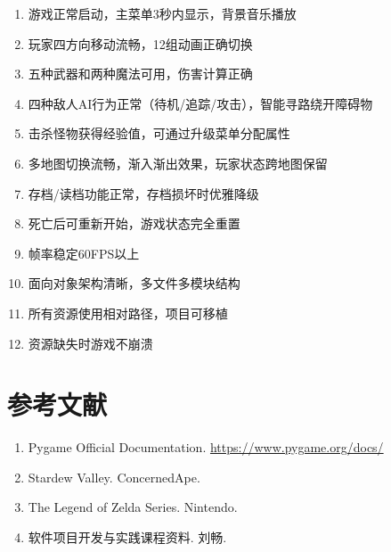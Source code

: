 \documentclass[12pt,a4paper]{article}
\begin{document}
\begin{enumerate}[leftmargin=2em]
    \item 游戏正常启动，主菜单3秒内显示，背景音乐播放
    \item 玩家四方向移动流畅，12组动画正确切换
    \item 五种武器和两种魔法可用，伤害计算正确
    \item 四种敌人AI行为正常（待机/追踪/攻击），智能寻路绕开障碍物
    \item 击杀怪物获得经验值，可通过升级菜单分配属性
    \item 多地图切换流畅，渐入渐出效果，玩家状态跨地图保留
    \item 存档/读档功能正常，存档损坏时优雅降级
    \item 死亡后可重新开始，游戏状态完全重置
    \item 帧率稳定60FPS以上
    \item 面向对象架构清晰，多文件多模块结构
    \item 所有资源使用相对路径，项目可移植
    \item 资源缺失时游戏不崩溃
\end{enumerate}


\section*{参考文献}
\begin{enumerate}[leftmargin=2em]
    \item Pygame Official Documentation. \url{https://www.pygame.org/docs/}
    \item Stardew Valley. ConcernedApe.
    \item The Legend of Zelda Series. Nintendo.
    \item 软件项目开发与实践课程资料. 刘畅.
\end{enumerate}
\end{document}
